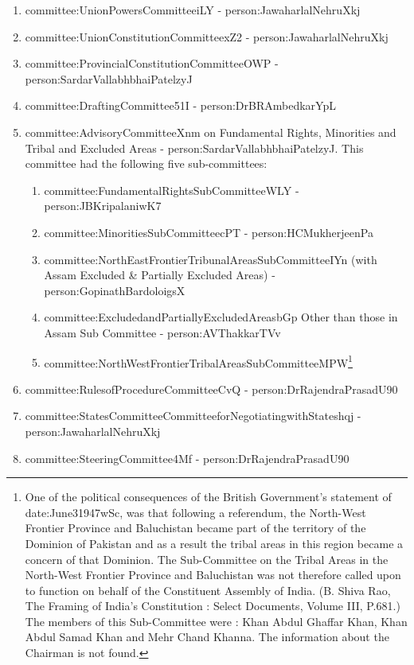\begin{enumerate}
  \item \gls{committee:UnionPowersCommitteeiLY} - \gls{person:JawaharlalNehruXkj}
  \item \gls{committee:UnionConstitutionCommitteexZ2} - \gls{person:JawaharlalNehruXkj}
  \item \gls{committee:ProvincialConstitutionCommitteeOWP} - \gls{person:SardarVallabhbhaiPatelzyJ}
  \item \gls{committee:DraftingCommittee51I} - \gls{person:DrBRAmbedkarYpL}
  \item \gls{committee:AdvisoryCommitteeXnm} on Fundamental Rights, Minorities and Tribal and Excluded Areas - \gls{person:SardarVallabhbhaiPatelzyJ}. This committee had the following five sub-committees:
  \begin{enumerate}
    \item \gls{committee:FundamentalRightsSubCommitteeWLY} - \gls{person:JBKripalaniwK7}
    \item \gls{committee:MinoritiesSubCommitteecPT} - \gls{person:HCMukherjeenPa}
    \item \gls{committee:NorthEastFrontierTribunalAreasSubCommitteeIYn} (with Assam Excluded \& Partially Excluded Areas) - \gls{person:GopinathBardoloigsX}
    \item \gls{committee:ExcludedandPartiallyExcludedAreasbGp} Other than those in Assam Sub Committee - \gls{person:AVThakkarTVv}
    \item \gls{committee:NorthWestFrontierTribalAreasSubCommitteeMPW}\footnote{One of the political consequences of the British Government’s statement of \gls{date:June31947wSc}, was that following a referendum, the North-West Frontier Province and Baluchistan became part of the territory of the Dominion of Pakistan and as a result the tribal areas in this region became a concern of that Dominion. The Sub-Committee on the Tribal Areas in the North-West Frontier Province and Baluchistan was not therefore called upon to function on behalf of the Constituent Assembly of India. (B. Shiva Rao, The Framing of India’s Constitution : Select Documents, Volume III, P.681.) The members of this Sub-Committee were : Khan Abdul Ghaffar Khan, Khan Abdul Samad Khan and Mehr Chand Khanna. The information about the Chairman is not found.}
  \end{enumerate}
  
  \item \gls{committee:RulesofProcedureCommitteeCvQ} - \gls{person:DrRajendraPrasadU90}
  \item \gls{committee:StatesCommitteeCommitteeforNegotiatingwithStateshqj} - \gls{person:JawaharlalNehruXkj}
  \item \gls{committee:SteeringCommittee4Mf} - \gls{person:DrRajendraPrasadU90}
\end{enumerate}

